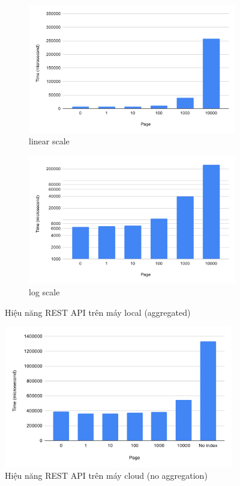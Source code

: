 \begin{figure}[H]
\centering
\begin{subfigure}{0.5\textwidth}
    \centering
    \includegraphics[width=\textwidth]
    {images/testing/view-aggregated-local.png}
    \caption{linear scale}
\end{subfigure}%
\begin{subfigure}{0.5\textwidth}
    \centering
    \includegraphics[width=\textwidth]
    {images/testing/view-aggregated-local-log.png}
    \caption{log scale}
\end{subfigure}
\caption{Hiệu năng REST API trên máy local (aggregated)}
\end{figure}

\begin{figure}[H]
\centering
\includegraphics[width=10cm]{images/testing/view-cloud.png}
\caption{Hiệu năng REST API trên máy cloud (no aggregation)}
\end{figure}

